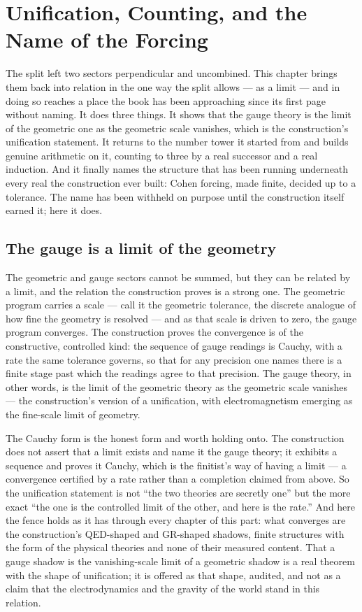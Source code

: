 \chapter{Unification, Counting, and the Name of the Forcing}
\label{chap:unification-counting-forcing}

The split left two sectors perpendicular and uncombined. This chapter brings them back into relation in
the one way the split allows --- as a limit --- and in doing so reaches a place the book has been
approaching since its first page without naming. It does three things. It shows that the gauge theory is
the limit of the geometric one as the geometric scale vanishes, which is the construction's unification
statement. It returns to the number tower it started from and builds genuine arithmetic on it, counting
to three by a real successor and a real induction. And it finally names the structure that has been
running underneath every real the construction ever built: Cohen forcing, made finite, decided up to a
tolerance. The name has been withheld on purpose until the construction itself earned it; here it does.

\section{The gauge is a limit of the geometry}
\label{se:the-gauge-is-a-limit-of-the-geometry}

The geometric and gauge sectors cannot be summed, but they can be related by a limit, and the relation
the construction proves is a strong one. The geometric program carries a scale --- call it the geometric
tolerance, the discrete analogue of how fine the geometry is resolved --- and as that scale is driven to
zero, the gauge program converges. The construction proves the convergence is of the constructive,
controlled kind: the sequence of gauge readings is Cauchy, with a rate the same tolerance governs, so
that for any precision one names there is a finite stage past which the readings agree to that precision.
The gauge theory, in other words, is the limit of the geometric theory as the geometric scale vanishes
--- the construction's version of a unification, with electromagnetism emerging as the fine-scale limit
of geometry.

The Cauchy form is the honest form and worth holding onto. The construction does not assert that a limit
exists and name it the gauge theory; it exhibits a sequence and proves it Cauchy, which is the
finitist's way of having a limit --- a convergence certified by a rate rather than a completion claimed
from above. So the unification statement is not ``the two theories are secretly one'' but the more exact
``the one is the controlled limit of the other, and here is the rate.'' And here the fence holds as it
has through every chapter of this part: what converges are the construction's QED-shaped and GR-shaped
shadows, finite structures with the form of the physical theories and none of their measured content.
That a gauge shadow is the vanishing-scale limit of a geometric shadow is a real theorem with the shape
of unification; it is offered as that shape, audited, and not as a claim that the electrodynamics and
the gravity of the world stand in this relation.


